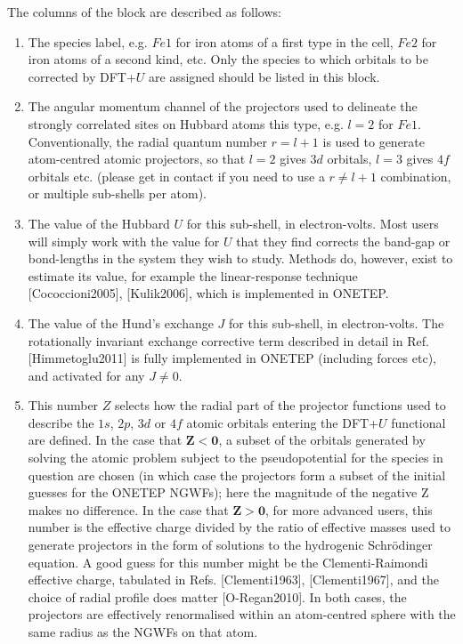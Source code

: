 \documentclass[letterpaper,10pt,english]{sphinxmanual}
\begin{document}
The columns of the  block are described as follows:
\begin{enumerate}
\item {} 
The species label, e.g. \(Fe1\) for iron atoms of a first type in
the cell, \(Fe2\) for iron atoms of a second kind, etc. Only the
species to which orbitals to be corrected by DFT+\(U\) are
assigned should be listed in this block.

\item {} 
The angular momentum channel of the projectors used to delineate the
strongly correlated sites on Hubbard atoms this type, e.g.
\(l=2\) for \(Fe1\). Conventionally, the radial quantum
number \(r=l+1\) is used to generate atom-centred atomic
projectors, so that \(l=2\) gives \(3d\) orbitals,
\(l=3\) gives \(4f\) orbitals etc. (please get in contact if
you need to use a \(r \ne l+1\) combination, or multiple
sub-shells per atom).

\item {} 
The value of the Hubbard \(U\) for this sub-shell, in
electron-volts. Most users will simply work with the value for
\(U\) that they find corrects the band-gap or bond-lengths in the
system they wish to study. Methods do, however, exist to estimate its
value, for example the linear-response technique
{[}Cococcioni2005{]}, {[}Kulik2006{]}, which is implemented in
ONETEP.

\item {} 
The value of the Hund’s exchange \(J\) for this sub-shell, in
electron-volts. The rotationally invariant exchange corrective term
described in detail in Ref. {[}Himmetoglu2011{]} is fully
implemented in ONETEP (including forces etc), and activated for any
\(J \ne 0\).

\item {} 
This number \(Z\) selects how the radial part of the projector
functions used to describe the \(1s\), \(2p\), \(3d\) or
\(4f\) atomic orbitals entering the DFT+\(U\) functional
are defined. In the case that \(\mathbf{ Z < 0}\), a subset of
the orbitals generated by solving the atomic problem subject to the
pseudopotential for the species in question are chosen (in which case
the projectors form a subset of the initial guesses for the ONETEP
NGWFs); here the magnitude of the negative Z makes no difference. In
the case that \(\mathbf{ Z > 0}\), for more advanced users, this
number is the effective charge divided by the ratio of effective
masses used to generate projectors in the form of solutions to the
hydrogenic Schrödinger equation. A good guess for this number might
be the Clementi-Raimondi effective charge, tabulated in
Refs. {[}Clementi1963{]}, {[}Clementi1967{]}, and the choice of
radial profile does matter {[}O-Regan2010{]}. In both
cases, the projectors are effectively renormalised within an
atom-centred sphere with the same radius as the NGWFs on that atom.


\end{enumerate}
\end{document}
